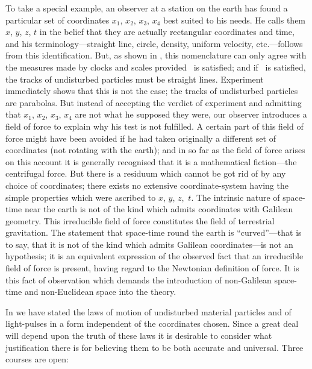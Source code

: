 \documentclass[12pt]{book}
\begin{document}
To take a special example, an observer at a station on the earth has found
a particular set of coordinates $x_1$, $x_2$, $x_3$, $x_4$ best suited to his needs. He calls
them $x$, $y$, $z$, $t$ in the belief that they are actually rectangular coordinates and
time, and his terminology---straight line, circle, density, uniform velocity, etc.---follows
from this identification. But, as shown in , this nomenclature can
only agree with the measures made by clocks and scales provided ~is
satisfied; and if ~is satisfied, the tracks of undisturbed particles must be
straight lines. Experiment immediately shows that this is not the case; the
tracks of undisturbed particles are parabolas. But instead of accepting the
verdict of experiment and admitting that $x_1$, $x_2$, $x_3$, $x_4$ are not what he supposed
they were, our observer introduces a field of force to explain why his
test is not fulfilled. A certain part of this field of force might have been
avoided if he had taken originally a different set of coordinates (not rotating
with the earth); and in so far as the field of force arises on this account it is
generally recognised that it is a mathematical fiction---the centrifugal force.
But there is a residuum which cannot be got rid of by any choice of coordinates;
there exists no extensive coordinate\hyp{}system having the simple
properties which were ascribed to $x$, $y$, $z$,~$t$. The intrinsic nature of space\hyp{}time
near the earth is not of the kind which admits coordinates with Galilean
geometry. This irreducible field of force constitutes the field of terrestrial
gravitation. The statement that space\hyp{}time round the earth is ``curved''---that
is to say, that it is not of the kind which admits Galilean coordinates---is
not an hypothesis; it is an equivalent expression of the observed fact that
an irreducible field of force is present, having regard to the Newtonian
definition of force. It is this fact of observation which demands the introduction
of non\hyp{}Galilean space\hyp{}time and non\hyp{}Euclidean space into the theory.


In  we have stated the laws of motion of undisturbed material particles
and of light\hyp{}pulses in a form independent of the coordinates chosen. Since
a great deal will depend upon the truth of these laws it is desirable to
consider what justification there is for believing them to be both accurate
and universal. Three courses are open:
\end{document}
